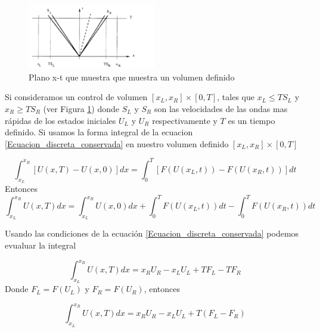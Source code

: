 \documentclass[12pt,a4paper]{book}
\begin{document}
\begin{figure} %
  \centering
    \includegraphics[width=0.5\textwidth]{Figuras/HLL_onda.png}
  \caption{Plano x-t que muestra que muestra un volumen definido}
  \label{fig:Plano x_t}
\end{figure}

Si consideramos un control de volumen $\left[x_L, x_R \right]\times \left[ 0 , T \right]$, tales que $x_L \leq TS_L$ y $x_R \geq TS_R$ (ver Figura \ref{fig:Plano x_t}) donde $S_L$ y $S_R$ son las velocidades de las ondas mas rápidas de los 
estados iniciales $U_L$ y $U_R$ respectivamente y $T$ es un tiempo definido. Si usamos la forma integral de la 
ecuacion \ref{Ecuacion_discreta_conservada} en nuestro volumen definido $\left[x_L, x_R \right]\times \left[ 0 , T \right]$

\begin{equation*}\label{Forma_integral_conservadas}
\int_{x_L}^{x_R} \left[ U\left( x, T \right) -
 U\left( x, 0 \right) \right] dx = 
 \int_{0}^{T} \left[ F \left(U\left( x_L, t \right) \right) -
 F \left(U\left( x_R, t \right) \right) \right] dt 
\end{equation*}
Entonces
\begin{equation}\label{integral_consistencia}
\int_{x_L}^{x_R} U\left( x, T \right) dx =\int_{x_L}^{x_R} U\left( x, 0 \right) dx+
\int_{0}^{T}  F \left(U\left( x_L, t \right) \right)dt -
\int_{0}^{T}  F \left(U\left( x_R, t \right) \right) dt
\end{equation}

Usando las condiciones de la ecuación \ref{Ecuacion_discreta_conservada} podemos evualuar la integral

\begin{equation*}
\int_{x_L}^{x_R} U\left( x, T \right) dx = 
x_R U_R -x_L U_L+T F_L-T F_R
\end{equation*}
Donde $F_L = F \left( U_L \right)$ y $F_R = F \left( U_R \right)$, entonces

\begin{equation}\label{Condición_de_consistencia}
\int_{x_L}^{x_R} U\left( x, T \right) dx = 
x_R U_R -x_L U_L+T \left( F_L- F_R \right)
\end{equation}
\end{document}
